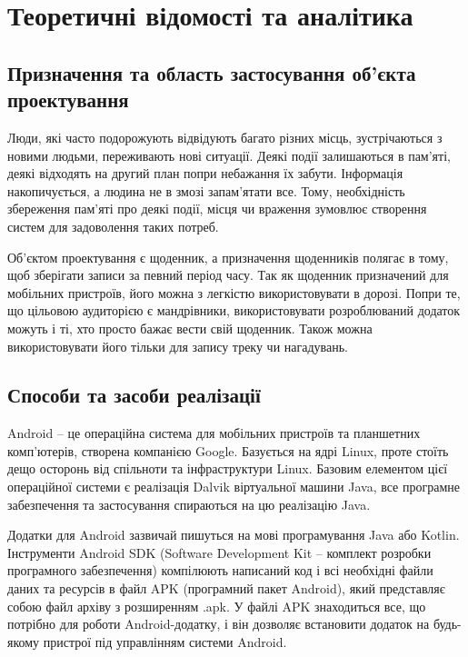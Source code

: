 \documentclass[../main.tex]{subfiles}
\begin{document}
\chapter{Теоретичні відомості та аналітика}

\section{Призначення та область застосування об'єкта проектування}

Люди, які часто подорожують відвідують багато різних місць, зустрічаються з новими людьми, переживають нові ситуації. Деякі події залишаються в пам'яті, деякі відходять на другий план попри небажання їх забути. Інформація накопичується, а людина не в змозі запам'ятати все. Тому, необхідність збереження пам'яті про деякі події, місця чи враження зумовлює створення систем для задоволення таких потреб.

Об'єктом проектування є щоденник, а призначення щоденників полягає в тому, щоб зберігати записи за певний період часу. Так як щоденник призначений для мобільних пристроїв, його можна з легкістю використовувати в дорозі. Попри те, що цільовою аудиторією є мандрівники, використовувати розроблюваний додаток можуть і ті, хто просто бажає вести свій щоденник. Також можна використовувати його тільки для запису треку чи нагадувань.

\section{Способи та засоби реалізації}


Android -- це операційна система для мобільних пристроїв та планшетних комп'ютерів, створена компанією Google. Базується на ядрі Linux, проте стоїть дещо осторонь від спільноти та інфраструктури Linux. Базовим елементом цієї операційної системи є реалізація Dalvik віртуальної машини Java, все програмне забезпечення та застосування спираються на цю реалізацію Java.

Додатки для Android зазвичай пишуться на мові програмування Java або Kotlin. Інструменти Android SDK (Software Development Kit -- комплект розробки програмного забезпечення) компілюють написаний код і всі необхідні файли даних та ресурсів в файл APK (програмний пакет Android), який представляє собою файл архіву з розширенням .apk. У файлі APK знаходиться все, що потрібно для роботи Android-додатку, і він дозволяє встановити додаток на будь-якому пристрої під управлінням системи Android. 
\end{document}
